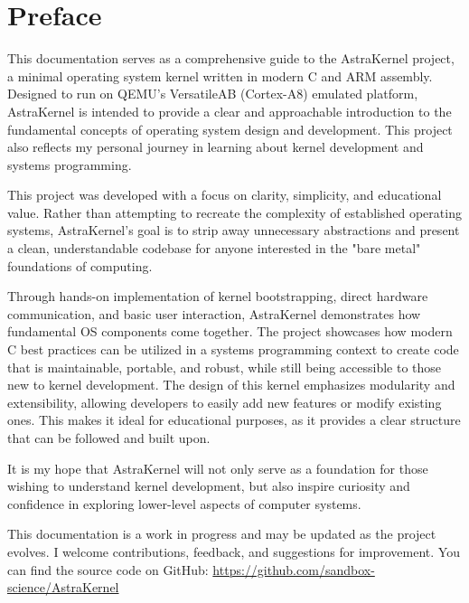 \onehalfspacing
\newpage
{}
\section*{Preface}

This documentation serves as a comprehensive guide to the AstraKernel project, 
a minimal operating system kernel written in modern C and ARM assembly. 
Designed to run on QEMU’s VersatileAB (Cortex-A8) emulated platform, 
AstraKernel is intended to provide a clear and approachable introduction 
to the fundamental concepts of operating system design and development.
This project also reflects my personal journey in learning about kernel development  
and systems programming.

This project was developed with a focus on clarity, simplicity, and educational value. 
Rather than attempting to recreate the complexity of established operating systems, 
AstraKernel’s goal is to strip away unnecessary abstractions and present a clean, 
understandable codebase for anyone interested in the "bare metal" foundations of computing.

Through hands-on implementation of kernel bootstrapping, direct hardware communication, 
and basic user interaction, AstraKernel demonstrates how fundamental OS components 
come together. The project showcases how modern C best practices can be utilized 
in a systems programming context to create code that is maintainable, portable, and robust, 
while still being accessible to those new to kernel development. The design of this kernel 
emphasizes modularity and extensibility, allowing developers to easily add new features 
or modify existing ones. This makes it ideal for educational purposes, as it provides 
a clear structure that can be followed and built upon.

It is my hope that AstraKernel will not only serve as a foundation for those wishing 
to understand kernel development, but also inspire curiosity and confidence in exploring 
lower-level aspects of computer systems.

\begin{info}
  This documentation is a work in progress and may be updated
  as the project evolves. I welcome contributions, feedback,
  and suggestions for improvement. You can find the source code on GitHub:
  \url{https://github.com/sandbox-science/AstraKernel}
\end{info}

